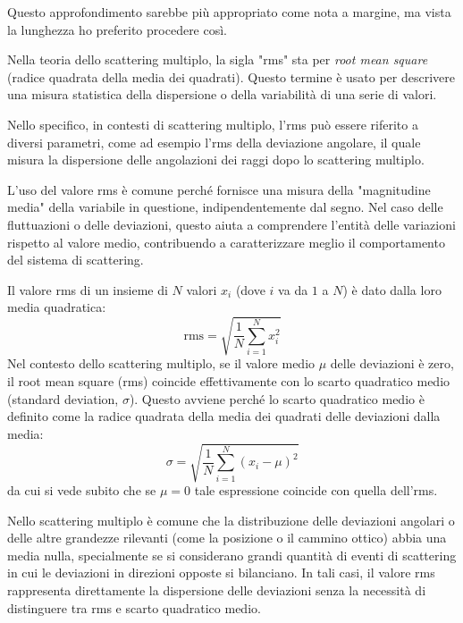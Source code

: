 \begin{approfondimento}
    \footnotesize
    Questo approfondimento sarebbe più appropriato come nota a margine, ma vista la lunghezza ho preferito procedere così.

    \vspace{0.2cm}Nella teoria dello scattering multiplo, la sigla "rms" sta per \textit{root mean square} (radice quadrata della media dei quadrati). Questo termine è usato per descrivere una misura statistica della dispersione o della variabilità di una serie di valori.

    Nello specifico, in contesti di scattering multiplo, l'rms può essere riferito a diversi parametri, come ad esempio l'rms della deviazione angolare, il quale misura la dispersione delle angolazioni dei raggi dopo lo scattering multiplo.
    
    L'uso del valore rms è comune perché fornisce una misura della "magnitudine media" della variabile in questione, indipendentemente dal segno. Nel caso delle fluttuazioni o delle deviazioni, questo aiuta a comprendere l'entità delle variazioni rispetto al valore medio, contribuendo a caratterizzare meglio il comportamento del sistema di scattering.
    
    Il valore rms di un insieme di $N$ valori $x_i$ (dove $i$ va da $1$ a $N$) è dato dalla loro media quadratica:
    \begin{equation*}
        \textstyle \text{rms}
        =\sqrt{\frac{1}{N}\sum_{i=1}^{N} x_i^2}
    \end{equation*}
    Nel contesto dello scattering multiplo, se il valore medio $\mu$ delle deviazioni è zero, il root mean square (rms) coincide effettivamente con lo scarto quadratico medio (standard deviation, $\sigma$). Questo avviene perché lo scarto quadratico medio è definito come la radice quadrata della media dei quadrati delle deviazioni dalla media:
    \begin{equation*}
        \textstyle \sigma
        =\sqrt{\frac{1}{N}\sum_{i=1}^{N} (x_i - \mu)^2}
    \end{equation*}
    da cui si vede subito che se $\mu=0$ tale espressione coincide con quella dell'rms.
    
    Nello scattering multiplo è comune che la distribuzione delle deviazioni angolari o delle altre grandezze rilevanti (come la posizione o il cammino ottico) abbia una media nulla, specialmente se si considerano grandi quantità di eventi di scattering in cui le deviazioni in direzioni opposte si bilanciano. In tali casi, il valore rms rappresenta direttamente la dispersione delle deviazioni senza la necessità di distinguere tra rms e scarto quadratico medio.
\end{approfondimento}


